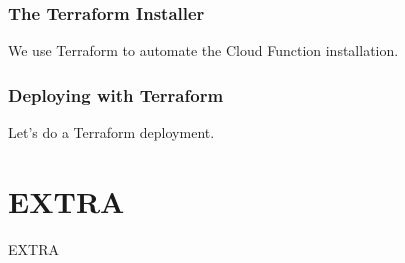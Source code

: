 \documentclass[aspectratio=169]{beamer}
\begin{document}
\begin{frame}
	\frametitle{The Terraform Installer}

	We use Terraform to automate the Cloud Function installation.

\end{frame}

\begin{frame}
	\frametitle{Deploying with Terraform}

	Let's do a Terraform deployment.

\end{frame}



\section{EXTRA}
\begin{frame}
	\Huge \textcolor{dgreen}{EXTRA}
\end{frame}

\end{document}
